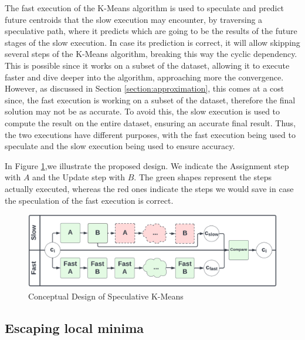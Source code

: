 The fast execution of the K-Means algorithm is used to speculate and predict future centroids that the slow execution may encounter, by traversing a speculative path, where it predicts which are going to be the results of the future stages of the slow execution. In case its prediction is correct, it will allow skipping several steps of the K-Means algorithm, breaking this way the cyclic dependency. This is possible since it works on a subset of the dataset, allowing it to execute faster and dive deeper into the algorithm, approaching more the convergence. However, as discussed in Section \ref{section:approximation}, this comes at a cost since, the fast execution is working on a subset of the dataset, therefore the final solution may not be as accurate. To avoid this, the slow execution is used to compute the result on the entire dataset, ensuring an accurate final result. Thus, the two executions have different purposes, with the fast execution being used to speculate and the slow execution being used to ensure accuracy.

In Figure \ref{fig:speculation_conceptual_design},we illustrate the proposed design. We indicate the Assignment step with $A$ and the Update step with $B$. The green shapes represent the steps actually executed, whereas the red ones indicate the steps we would save in case the speculation of the fast execution is correct. 

\begin{figure}[h]
\centering
\includegraphics[width=\linewidth]{./plots/speculative_KMeans_conceptual_design.png}
\caption{Conceptual Design of Speculative K-Means}
\label{fig:speculation_conceptual_design}
\end{figure}


\subsection{Escaping local minima}

